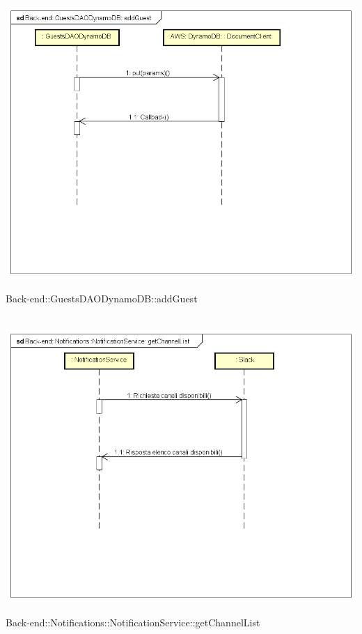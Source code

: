 \\ \includegraphics[width=\textwidth,height=\textheight,keepaspectratio]{images/diagrams/back-end/Ufficial_Backend/Back-end__GuestsDAODynamoDB__addGuest.png} 	\caption{Back-end::GuestsDAODynamoDB::addGuest}
\\ \includegraphics[width=\textwidth,height=\textheight,keepaspectratio]{images/diagrams/back-end/Ufficial_Backend/Back-end__Notifications__NotificationService__getChannelList.png} 	\caption{Back-end::Notifications::NotificationService::getChannelList}
